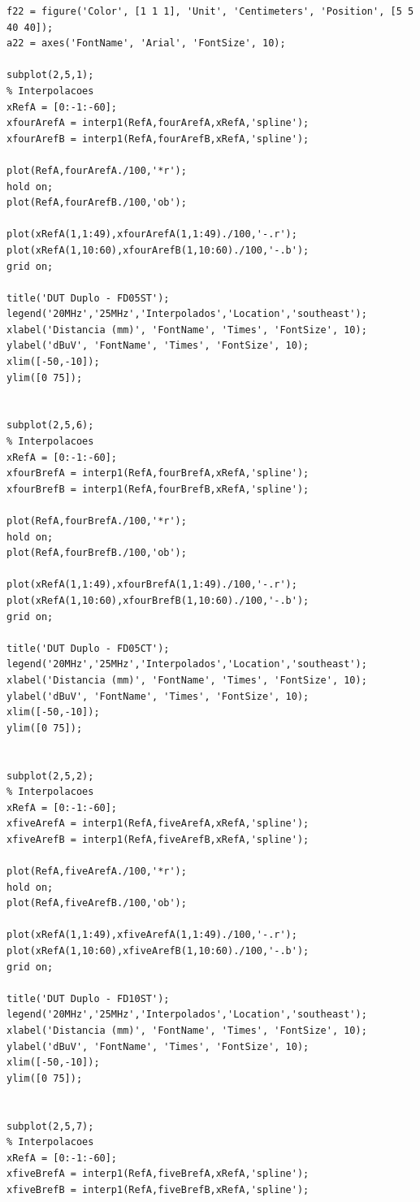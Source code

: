 \begin{lstlisting}
f22 = figure('Color', [1 1 1], 'Unit', 'Centimeters', 'Position', [5 5 40 40]);
a22 = axes('FontName', 'Arial', 'FontSize', 10);

subplot(2,5,1);
% Interpolacoes
xRefA = [0:-1:-60];
xfourArefA = interp1(RefA,fourArefA,xRefA,'spline');
xfourArefB = interp1(RefA,fourArefB,xRefA,'spline');

plot(RefA,fourArefA./100,'*r');
hold on;
plot(RefA,fourArefB./100,'ob');

plot(xRefA(1,1:49),xfourArefA(1,1:49)./100,'-.r');
plot(xRefA(1,10:60),xfourArefB(1,10:60)./100,'-.b');
grid on;

title('DUT Duplo - FD05ST');
legend('20MHz','25MHz','Interpolados','Location','southeast');
xlabel('Distancia (mm)', 'FontName', 'Times', 'FontSize', 10);
ylabel('dBuV', 'FontName', 'Times', 'FontSize', 10);
xlim([-50,-10]);
ylim([0 75]);


subplot(2,5,6);
% Interpolacoes
xRefA = [0:-1:-60];
xfourBrefA = interp1(RefA,fourBrefA,xRefA,'spline');
xfourBrefB = interp1(RefA,fourBrefB,xRefA,'spline');

plot(RefA,fourBrefA./100,'*r');
hold on;
plot(RefA,fourBrefB./100,'ob');

plot(xRefA(1,1:49),xfourBrefA(1,1:49)./100,'-.r');
plot(xRefA(1,10:60),xfourBrefB(1,10:60)./100,'-.b');
grid on;

title('DUT Duplo - FD05CT');
legend('20MHz','25MHz','Interpolados','Location','southeast');
xlabel('Distancia (mm)', 'FontName', 'Times', 'FontSize', 10);
ylabel('dBuV', 'FontName', 'Times', 'FontSize', 10);
xlim([-50,-10]);
ylim([0 75]);


subplot(2,5,2);
% Interpolacoes
xRefA = [0:-1:-60];
xfiveArefA = interp1(RefA,fiveArefA,xRefA,'spline');
xfiveArefB = interp1(RefA,fiveArefB,xRefA,'spline');

plot(RefA,fiveArefA./100,'*r');
hold on;
plot(RefA,fiveArefB./100,'ob');

plot(xRefA(1,1:49),xfiveArefA(1,1:49)./100,'-.r');
plot(xRefA(1,10:60),xfiveArefB(1,10:60)./100,'-.b');
grid on;

title('DUT Duplo - FD10ST');
legend('20MHz','25MHz','Interpolados','Location','southeast');
xlabel('Distancia (mm)', 'FontName', 'Times', 'FontSize', 10);
ylabel('dBuV', 'FontName', 'Times', 'FontSize', 10);
xlim([-50,-10]);
ylim([0 75]);


subplot(2,5,7);
% Interpolacoes
xRefA = [0:-1:-60];
xfiveBrefA = interp1(RefA,fiveBrefA,xRefA,'spline');
xfiveBrefB = interp1(RefA,fiveBrefB,xRefA,'spline');


\end{lstlisting}
